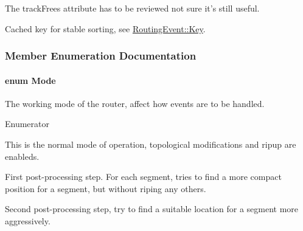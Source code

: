 The track\-Frees attribute has to be reviewed not sure it's still useful.

Cached key for stable sorting, see \hyperlink{classKite_1_1RoutingEvent_1_1Key}{Routing\-Event\-::\-Key}. 

\subsubsection{Member Enumeration Documentation}
\hypertarget{classKite_1_1RoutingEvent_a46c8a310cf4c094f8c80e1cb8dc1f911}{
\paragraph[{Mode}]{\setlength{\rightskip}{0pt plus 5cm}enum {\bf Mode}}}\label{classKite_1_1RoutingEvent_a46c8a310cf4c094f8c80e1cb8dc1f911}
The working mode of the router, affect how events are to be handled. \begin{Desc}
\item[Enumerator]\par
\begin{description}
\item[{\em 
\hypertarget{classKite_1_1RoutingEvent_a46c8a310cf4c094f8c80e1cb8dc1f911a3980b02882c46c9bd4caf15040b85d1a}{Negociate}\label{classKite_1_1RoutingEvent_a46c8a310cf4c094f8c80e1cb8dc1f911a3980b02882c46c9bd4caf15040b85d1a}
}]This is the normal mode of operation, topological modifications and ripup are enableds. \item[{\em 
\hypertarget{classKite_1_1RoutingEvent_a46c8a310cf4c094f8c80e1cb8dc1f911a5afe185b48d7acf013dd5ccadc5b2414}{Pack}\label{classKite_1_1RoutingEvent_a46c8a310cf4c094f8c80e1cb8dc1f911a5afe185b48d7acf013dd5ccadc5b2414}
}]First post-\/processing step. For each segment, tries to find a more compact position for a segment, but without riping any others. \item[{\em 
\hypertarget{classKite_1_1RoutingEvent_a46c8a310cf4c094f8c80e1cb8dc1f911a27b403019a93f9f127cf64a0688a8288}{Repair}\label{classKite_1_1RoutingEvent_a46c8a310cf4c094f8c80e1cb8dc1f911a27b403019a93f9f127cf64a0688a8288}
}]Second post-\/processing step, try to find a suitable location for a segment more aggressively. \end{description}
\end{Desc}


